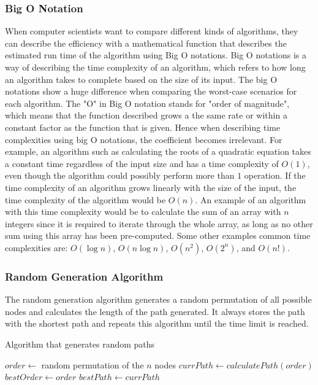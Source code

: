 \documentclass{article}
\begin{document}
\subsubsection{Big O Notation}\label{Big O}
When computer scientists want to compare different kinds of algorithms, they can describe the efficiency with a mathematical function that describes the estimated run time of the algorithm using Big O notations. Big O notations is a way of describing the time complexity of an algorithm, which refers to how long an algorithm takes to complete based on the size of its input. The big O notations show a huge difference when comparing the worst-case scenarios for each algorithm.
\newline
 The "O" in Big O notation stands for "order of magnitude", which means that the function described grows a the same rate or within a constant factor as the function that is given. Hence when describing time complexities using big O notations, the coefficient becomes irrelevant. For example, an algorithm such as calculating the roots of a quadratic equation takes a constant time regardless of the input size and has a time complexity of $O(1)$, even though the algorithm could possibly perform more than $1$ operation. If the time complexity of an algorithm grows linearly with the size of the input, the time complexity of the algorithm would be $O(n)$. An example of an algorithm with this time complexity would be to calculate the sum of an array with $n$ integers since it is required to iterate through the whole array, as long as no other sum using this array has been pre-computed. Some other examples common time complexities are: $O(\log{n})$, $O(n \log{n})$, $O(n^2)$, $O(2^n)$, and $O(n!)$.


\newline

\subsubsection{Random Generation Algorithm}\label{Random}
The random generation algorithm generates a random permutation of all possible nodes and calculates the length of the path generated. It always stores the path with the shortest path and repeats this algorithm until the time limit is reached. 

\begin{algorithm}
\caption{Algorithm that generates random paths}\label{Random Algorithm}
\begin{algorithmic}

\State $order \gets $ random permutation of the $n$ nodes
\State $currPath \gets calculatePath(order)$
\State $bestOrder \gets order$
\State $bestPath \gets currPath$
\EndIf
\EndWhile

\end{algorithmic}
\end{algorithm}
\end{document}
